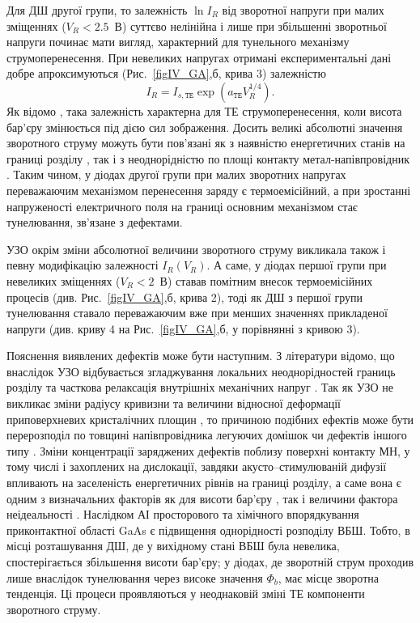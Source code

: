 \documentclass[a4paper,14pt,oneside,openany]{memoir}
\begin{document}
Для ДШ другої групи, то залежність $\ln I_R$ від зворотної напруги при малих зміщеннях ($V_R<2.5$~В) суттєво нелінійна
і лише при збільшенні зворотньої напруги починає мати вигляд, характерний для тунельного механізму струмоперенесення.
При невеликих напругах отримані експериментальні дані добре апроксимуються (Рис.~\ref{figIV_GA},б, крива 3) залежністю
\begin{equation}\label{eqIR2:GA}
I_R=I_{s,\mathtt{TE}}\exp\left(a_\mathtt{TE}V_R^{1/4}\right).
\end{equation}
Як відомо \cite{Rhoderick1988},
така залежність характерна для ТЕ струмоперенесення, коли висота бар’єру змінюється під дією сил зображення.
Досить великі абсолютні значення зворотного струму можуть бути пов’язані як з наявністю енергетичних станів на границі розділу \cite{Singh1994,Tseng1987}, так і з неоднорідністю по площі контакту метал-напівпровідник \cite{Askerov:PhD}.
Таким чином, у діодах другої групи при малих зворотних напругах переважаючим механізмом перенесення заряду є термоемісійний, а при зростанні напруженості електричного поля на границі основним механізмом стає тунелювання, зв'язане з дефектами.

УЗО окрім зміни абсолютної величини зворотного струму викликала також і певну модифікацію залежності $I_R(V_R)$.
А саме, у діодах першої групи при невеликих зміщеннях ($V_R<2$~В) ставав помітним внесок термоемісійних процесів (див. Рис.~\ref{figIV_GA},б, крива 2),
тоді як ДШ з першої групи тунелювання ставало переважаючим вже при менших значеннях прикладеної напруги (див. криву 4 на Рис.~\ref{figIV_GA},б, у порівнянні з кривою 3).

Пояснення виявлених дефектів може бути наступним.
З літератури  відомо, що внаслідок УЗО відбувається згладжування локальних неоднорідностей границь розділу \cite{Parchinskii2003r} та
часткова релаксація внутрішніх механічних напруг \cite{BritunFTT,Zdeb1989}.
Так як УЗО не викликає зміни  радіусу кривизни та величини відносної деформації приповерхневих кристалічних площин \cite{UST:SDErmol},
то причиною подібних ефектів може бути перерозподіл по товщині напівпровідника легуючих домішок \cite{Zaver} чи дефектів іншого типу \cite{Ostrov2002FTPr}.
Зміни концентрації заряджених дефектів поблизу поверхні контакту МН, у тому числі і захоплених на дислокації, завдяки акусто--стимулюваній дифузії впливають на заселеність енергетичних рівнів на границі розділу, а саме вона є одним з визначальних факторів як для висоти бар’єру \cite{Rhoderick1988,Singh1994},
так і величини фактора неідеальності \cite{Ikoma}.
Наслідком АІ просторового та хімічного впорядкування приконтактної області GaAs є підвищення однорідності розподілу ВБШ.
Тобто, в місці розташування ДШ, де у вихідному стані ВБШ була невелика, спостерігається збільшення висоти бар'єру;
у діодах, де зворотній струм проходив лише внаслідок тунелювання через високе значення $\Phi_b$, має місце зворотна тенденція.
Ці процеси проявляються у неоднаковій зміні ТЕ компоненти зворотного струму.
\end{document}
